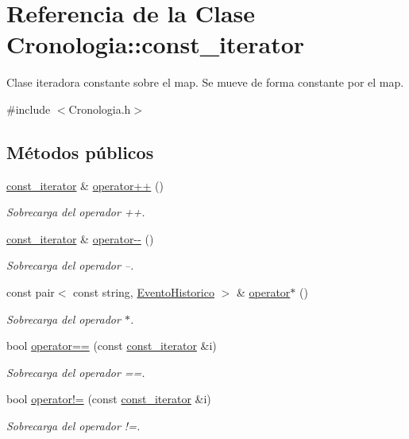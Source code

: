 \hypertarget{classCronologia_1_1const__iterator}{}\section{Referencia de la Clase Cronologia\+:\+:const\+\_\+iterator}
\label{classCronologia_1_1const__iterator}


Clase iteradora constante sobre el map. Se mueve de forma constante por el map.  




{\ttfamily \#include $<$Cronologia.\+h$>$}

\subsection*{Métodos públicos}
\begin{DoxyCompactItemize}
\item 
\hyperlink{classCronologia_1_1const__iterator}{const\+\_\+iterator} \& \hyperlink{classCronologia_1_1const__iterator_a7b821a0f25c98158f16e56d25d01699a}{operator++} ()
\begin{DoxyCompactList}\small\item\em Sobrecarga del operador ++. \end{DoxyCompactList}\item 
\hyperlink{classCronologia_1_1const__iterator}{const\+\_\+iterator} \& \hyperlink{classCronologia_1_1const__iterator_a97058081d7804ead71ef8d21f987451f}{operator-\/-\/} ()
\begin{DoxyCompactList}\small\item\em Sobrecarga del operador --. \end{DoxyCompactList}\item 
const pair$<$ const string, \hyperlink{classEventoHistorico}{Evento\+Historico} $>$ \& \hyperlink{classCronologia_1_1const__iterator_a13c2b31e5d730e4ddab293200716bfb5}{operator$\ast$} ()
\begin{DoxyCompactList}\small\item\em Sobrecarga del operador $\ast$. \end{DoxyCompactList}\item 
bool \hyperlink{classCronologia_1_1const__iterator_a1211695d544d56470a9f0b0e4e720318}{operator==} (const \hyperlink{classCronologia_1_1const__iterator}{const\+\_\+iterator} \&i)
\begin{DoxyCompactList}\small\item\em Sobrecarga del operador ==. \end{DoxyCompactList}\item 
bool \hyperlink{classCronologia_1_1const__iterator_a06469d58222f3731ebe69b6755d1979c}{operator!=} (const \hyperlink{classCronologia_1_1const__iterator}{const\+\_\+iterator} \&i)
\begin{DoxyCompactList}\small\item\em Sobrecarga del operador !=. \end{DoxyCompactList}\end{DoxyCompactItemize}
